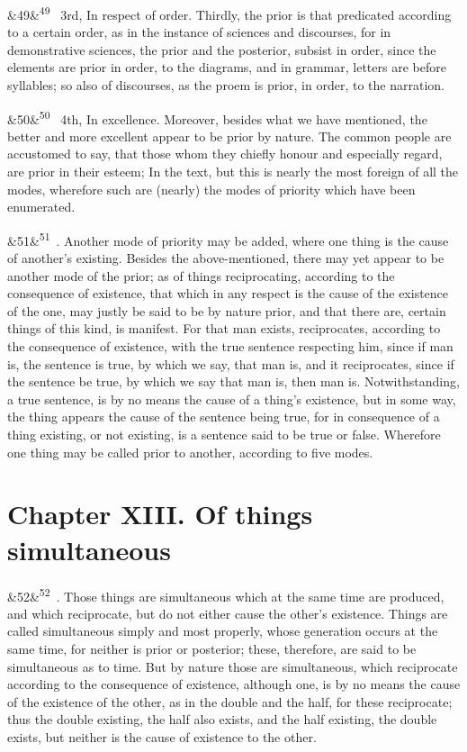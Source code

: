 \documentclass[12pt]{article}
\newcommand{\para}[1][]{\par\noindent\ifx&#1&\else\textsuperscript{\footnotesize #1}~\fi}
\begin{document}
\para[49] 3rd, In respect of order. Thirdly, the prior is that predicated according to a certain order, as in the instance of sciences and discourses, for in demonstrative sciences, the prior and the posterior, subsist in order, since the elements are prior in order, to the diagrams, and in grammar, letters are before syllables; so also of discourses, as the proem is prior, in order, to the narration.

\para[50] 4th, In excellence. Moreover, besides what we have mentioned, the better and more excellent appear to be prior by nature. The common people are accustomed to say, that those whom they chiefly honour and especially regard, are prior in their esteem; In the text, but this is nearly the most foreign of all the modes, wherefore such are (nearly) the modes of priority which have been enumerated.

\para[51] 2. Another mode of priority may be added, where one thing is the cause of another's existing. Besides the above-mentioned, there may yet appear to be another mode of the prior; as of things reciprocating, according to the consequence of existence, that which in any respect is the cause of the existence of the one, may justly be said to be by nature prior, and that there are, certain things of this kind, is manifest. For that man exists, reciprocates, according to the consequence of existence, with the true sentence respecting him, since if man is, the sentence is true, by which we say, that man is, and it reciprocates, since if the sentence be true, by which we say that man is, then man is. Notwithstanding, a true sentence, is by no means the cause of a thing's existence, but in some way, the thing appears the cause of the sentence being true, for in consequence of a thing existing, or not existing, is a sentence said to be true or false. Wherefore one thing may be called prior to another, according to five modes.

\section*{Chapter XIII. Of things simultaneous}

\para[52] 1. Those things are simultaneous which at the same time are produced, and which reciprocate, but do not either cause the other's existence. Things are called simultaneous simply and most properly, whose generation occurs at the same time, for neither is prior or posterior; these, therefore, are said to be simultaneous as to time. But by nature those are simultaneous, which reciprocate according to the consequence of existence, although one, is by no means the cause of the existence of the other, as in the double and the half, for these reciprocate; thus the double existing, the half also exists, and the half existing, the double exists, but neither is the cause of existence to the other.
\end{document}

